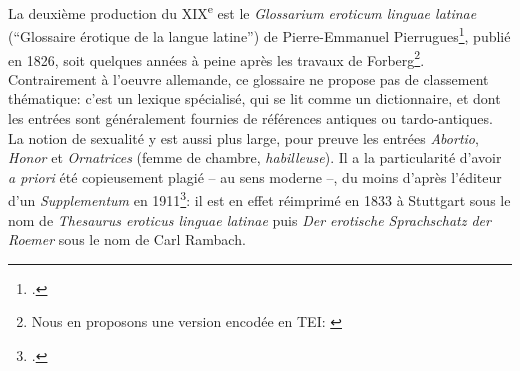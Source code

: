La deuxième production du XIX\textsuperscript{e} est le \textit{Glossarium eroticum linguae latinae} (\enquote{Glossaire érotique de la langue latine}) de Pierre-Emmanuel Pierrugues\footcite{pierrugues_glossarium_1826}, publié en 1826, soit quelques années à peine après les travaux de Forberg\footnote{Nous en proposons une version encodée en TEI: \textcite{Clerice_Lasciva_Roma_Lexical_2022}}. Contrairement à l'oeuvre allemande, ce glossaire ne propose pas de classement thématique: c'est un lexique spécialisé, qui se lit comme un dictionnaire, et dont les entrées sont généralement fournies de références antiques ou tardo-antiques. La notion de sexualité y est aussi plus large, pour preuve les entrées \textit{Abortio}, \textit{Honor} et \textit{Ornatrices} (femme de chambre, \textit{habilleuse}). Il a la particularité d'avoir \textit{a priori} été copieusement plagié -- au sens moderne --, du moins d'après l'éditeur d'un \textit{Supplementum} en 1911\footcite{pierrugues_supplementum_1911}: il est en effet réimprimé en 1833 à Stuttgart sous le nom de \textit{Thesaurus eroticus linguae latinae} puis \textit{Der erotische Sprachschatz der Roemer} sous le nom de Carl Rambach. 

